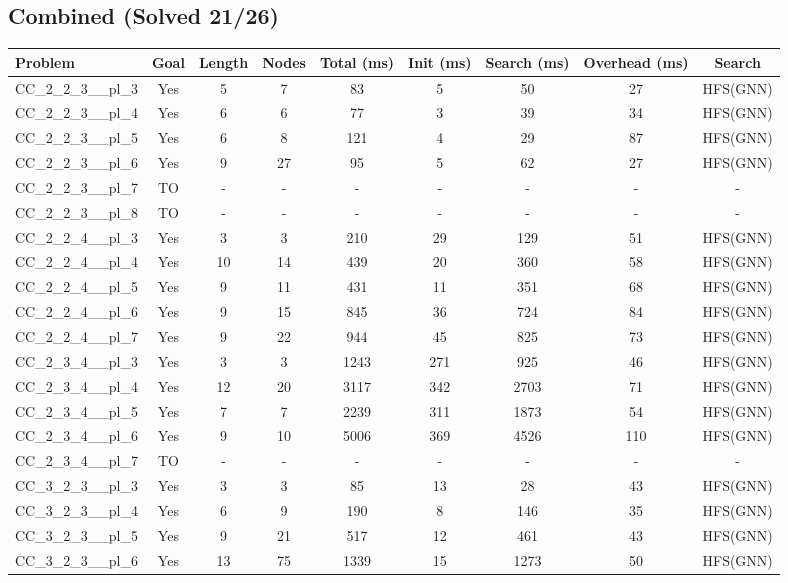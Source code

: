 \documentclass{article}
\begin{document}
\subsection*{Combined (Solved 21/26)}
\begin{tabular}{lcccccccc}
\toprule
Problem & Goal & Length & Nodes & Total (ms) & Init (ms) & Search (ms) & Overhead (ms) & Search \\
\midrule
CC\_2\_2\_3\_\_pl\_3 & Yes & 5 & 7 & 83 & 5 & 50 & 27 & HFS(GNN) \\
CC\_2\_2\_3\_\_pl\_4 & Yes & 6 & 6 & 77 & 3 & 39 & 34 & HFS(GNN) \\
CC\_2\_2\_3\_\_pl\_5 & Yes & 6 & 8 & 121 & 4 & 29 & 87 & HFS(GNN) \\
CC\_2\_2\_3\_\_pl\_6 & Yes & 9 & 27 & 95 & 5 & 62 & 27 & HFS(GNN) \\
CC\_2\_2\_3\_\_pl\_7 & TO & - & - & - & - & - & - & - \\
CC\_2\_2\_3\_\_pl\_8 & TO & - & - & - & - & - & - & - \\
CC\_2\_2\_4\_\_pl\_3 & Yes & 3 & 3 & 210 & 29 & 129 & 51 & HFS(GNN) \\
CC\_2\_2\_4\_\_pl\_4 & Yes & 10 & 14 & 439 & 20 & 360 & 58 & HFS(GNN) \\
CC\_2\_2\_4\_\_pl\_5 & Yes & 9 & 11 & 431 & 11 & 351 & 68 & HFS(GNN) \\
CC\_2\_2\_4\_\_pl\_6 & Yes & 9 & 15 & 845 & 36 & 724 & 84 & HFS(GNN) \\
CC\_2\_2\_4\_\_pl\_7 & Yes & 9 & 22 & 944 & 45 & 825 & 73 & HFS(GNN) \\
CC\_2\_3\_4\_\_pl\_3 & Yes & 3 & 3 & 1243 & 271 & 925 & 46 & HFS(GNN) \\
CC\_2\_3\_4\_\_pl\_4 & Yes & 12 & 20 & 3117 & 342 & 2703 & 71 & HFS(GNN) \\
CC\_2\_3\_4\_\_pl\_5 & Yes & 7 & 7 & 2239 & 311 & 1873 & 54 & HFS(GNN) \\
CC\_2\_3\_4\_\_pl\_6 & Yes & 9 & 10 & 5006 & 369 & 4526 & 110 & HFS(GNN) \\
CC\_2\_3\_4\_\_pl\_7 & TO & - & - & - & - & - & - & - \\
CC\_3\_2\_3\_\_pl\_3 & Yes & 3 & 3 & 85 & 13 & 28 & 43 & HFS(GNN) \\
CC\_3\_2\_3\_\_pl\_4 & Yes & 6 & 9 & 190 & 8 & 146 & 35 & HFS(GNN) \\
CC\_3\_2\_3\_\_pl\_5 & Yes & 9 & 21 & 517 & 12 & 461 & 43 & HFS(GNN) \\
CC\_3\_2\_3\_\_pl\_6 & Yes & 13 & 75 & 1339 & 15 & 1273 & 50 & HFS(GNN) \\

\end{tabular}
\end{document}
